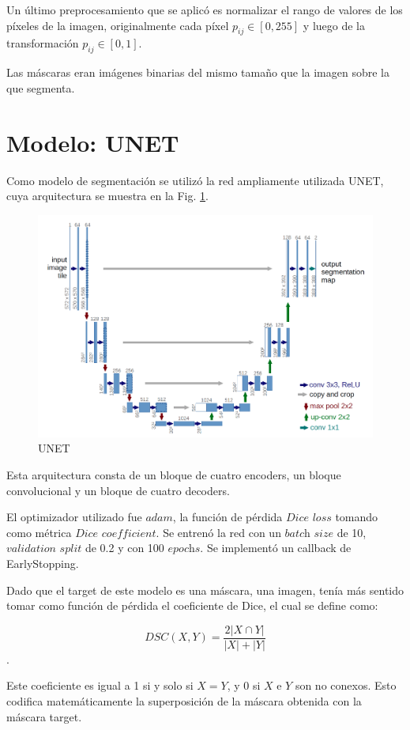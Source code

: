 Un último preprocesamiento que se aplicó es normalizar el rango de valores de los píxeles de la imagen, originalmente cada píxel $p_{ij}\in [0,255]$ y luego de la transformación $p_{ij}\in [0,1]$.

Las máscaras eran imágenes binarias del mismo tamaño que la imagen sobre la que segmenta. 


\section{Modelo: UNET}

Como modelo de segmentación se utilizó la red ampliamente utilizada UNET, cuya arquitectura se muestra en la Fig. \ref{fig.unet}. 

\begin{figure}[H]
\centering
        \includegraphics[width=0.7\linewidth]{chapters/segmentacion/images/unet.png}
        \caption{UNET}
        \label{fig.unet}
  \end{figure}

Esta arquitectura consta de un bloque de cuatro encoders, un bloque convolucional y un bloque de cuatro decoders. 

El optimizador utilizado fue $\textit{adam}$, la función de pérdida $\textit{Dice loss}$ tomando como métrica $\textit{Dice coefficient}$. Se entrenó la red con un $\textit{batch size}$ de 10, $\textit{validation split}$ de 0.2 y con 100 $\textit{epochs}$. Se implementó un callback de EarlyStopping. 

Dado que el target de este modelo es una máscara, una imagen, tenía más sentido tomar como función de pérdida el coeficiente de Dice, el cual se define como:

\begin{equation}
DSC(X,Y) = \frac{2|X\cap Y|}{|X|+|Y|}
\end{equation}.

Este coeficiente es igual a 1 si y solo si $X=Y$, y 0 si $X$ e $Y$ son no conexos. Esto codifica matemáticamente la superposición de la máscara obtenida con la máscara target. 

